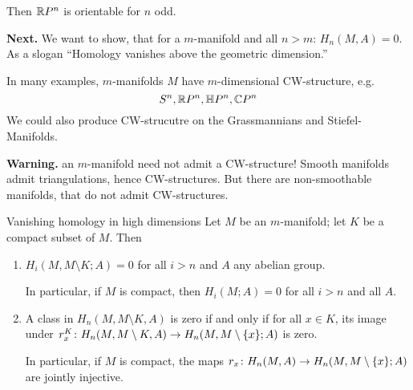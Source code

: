 \documentclass[language=english]{TemplateLecture}
\begin{document}
 Then \(\mathbb{R} P^n\) is orientable for \(n\) odd.

\textbf{Next.} We want to show, that for a \(m\)-manifold and all \(n > m\): \(H_n(M,A) = 0\).
As a slogan \enquote{Homology vanishes above the geometric dimension.}

In many examples, \(m\)-manifolds \(M\) have \(m\)-dimensional CW-structure, e.g.
\[S^n, \mathbb{R} P^n, \mathbb{H} P^n, \mathbb{C} P^n\]
We could also produce CW-strucutre on the Grassmannians and Stiefel-Manifolds.

\textbf{Warning.} an \(m\)-manifold need not admit a CW-structure! Smooth manifolds admit triangulations, hence CW-structures. But there are non-smoothable manifolds, that do not admit CW-structures.

\begin{thm}{Vanishing homology in high dimensions}{}
    Let \(M\) be an \(m\)-manifold; let \(K\) be a compact subset of \(M\). Then
    \begin{enumerate}
        \item \(H_i(M, M\setminus K; A) = 0\) for all \(i > n\) and \(A\) any abelian group.
        
        In particular, if \(M\) is compact, then \(H_i(M; A) = 0\) for all \(i > n\) and all \(A\).
        \item A class in \(H_n(M, M\setminus K, A)\) is zero if and only if for all \(x \in K\), its image under \(r_x^K\colon H_n(M, M\setminus K, A) \to H_n(M, M\setminus \{x\}; A)\) is zero.
        
        In particular, if \(M\) is compact, the maps \(r_x\colon H_n(M,A) \to H_n(M, M \setminus \{x\}; A)\) are jointly injective.
    \end{enumerate}
\end{thm}
\end{document}

